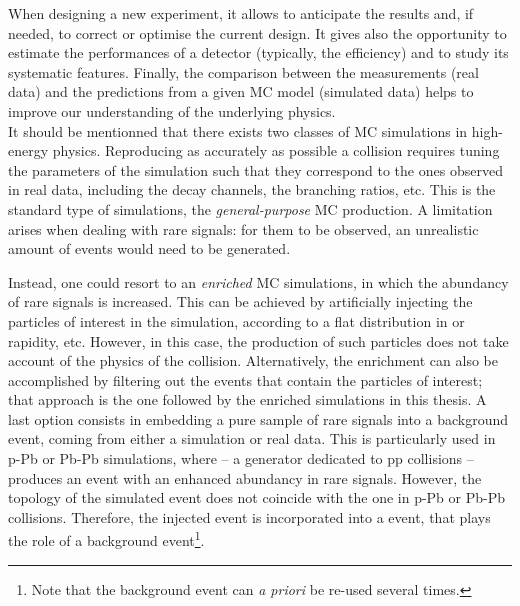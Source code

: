 When designing a new experiment, it allows to anticipate the results and, if needed, to correct or optimise the current design. It gives also the opportunity to estimate the performances of a detector (typically, the efficiency) and to study its systematic features. Finally, the comparison between the measurements (real data) and the predictions from a given MC model (simulated data) helps to improve our understanding of the underlying physics.\\

It should be mentionned that there exists two classes of MC simulations in high-energy physics. Reproducing as accurately as possible a collision requires tuning the parameters of the simulation such that they correspond to the ones observed in real data, including the decay channels, the branching ratios, etc. This is the standard type of simulations, the \textit{general-purpose} MC production. A limitation arises when dealing with rare signals: for them to be observed, an unrealistic amount of events would need to be generated. 

Instead, one could resort to an \textit{enriched} MC simulations, in which the abundancy of rare signals is increased. This can be achieved by artificially injecting the particles of interest in the simulation, according to a flat distribution in \pT or rapidity, etc. However, in this case, the production of such particles does not take account of the physics of the collision. Alternatively, the enrichment can also be accomplished by filtering out the events that contain the particles of interest; that approach is the one followed by the enriched simulations in this thesis. A last option consists in embedding a pure sample of rare signals into a background event, coming from either a simulation or real data. This is particularly used in p-Pb or Pb-Pb simulations, where \Pythia -- a generator dedicated to pp collisions -- produces an event with an enhanced abundancy in rare signals. However, the topology of the simulated event does not coincide with the one in p-Pb or Pb-Pb collisions. Therefore, the injected event is incorporated into a \Hijing event, that plays the role of a background event\footnote{Note that the background event can \textit{a priori} be re-used several times.}.
